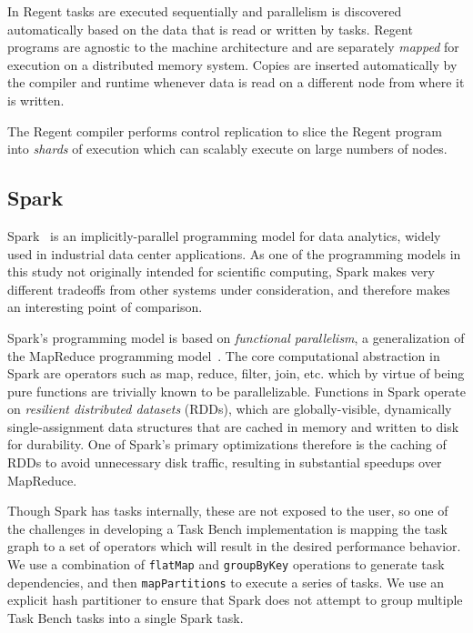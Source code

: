 In Regent tasks are executed sequentially and parallelism is
discovered automatically based on the data that is read or written by
tasks. Regent programs are agnostic to the machine architecture and
are separately \emph{mapped} for execution on a distributed memory
system. Copies are inserted automatically by the compiler and runtime
whenever data is read on a different node from where it is written.

The Regent compiler performs control replication to slice the Regent
program into \emph{shards} of execution which can scalably execute on
large numbers of nodes.

\subsection{Spark}

Spark~\cite{Spark10} is an implicitly-parallel programming model for
data analytics, widely used in industrial data center applications. As
one of the programming models in this study not originally intended
for scientific computing, Spark makes very different tradeoffs from
other systems under consideration, and therefore makes an interesting
point of comparison.

Spark's programming model is based on \emph{functional parallelism}, a
generalization of the MapReduce programming
model~\cite{MapReduce04}. The core computational abstraction in Spark
are operators such as map, reduce, filter, join, etc. which by virtue
of being pure functions are trivially known to be
parallelizable. Functions in Spark operate on \emph{resilient
  distributed datasets} (RDDs), which are globally-visible,
dynamically single-assignment data structures that are cached in memory
and written to disk for durability. One of Spark's primary
optimizations therefore is the caching of RDDs to avoid unnecessary
disk traffic, resulting in substantial speedups over MapReduce.

Though Spark has tasks internally, these are not exposed to the user,
so one of the challenges in developing a Task Bench implementation is
mapping the task graph to a set of operators which will result in the
desired performance behavior. We use a combination of
\lstinline[language=Scala]{flatMap} and
\lstinline[language=Scala]{groupByKey} operations to generate task
dependencies, and then \lstinline[language=Scala]{mapPartitions} to execute a
series of tasks. We use an explicit hash partitioner to ensure that
Spark does not attempt to group multiple Task Bench tasks into a
single Spark task.

